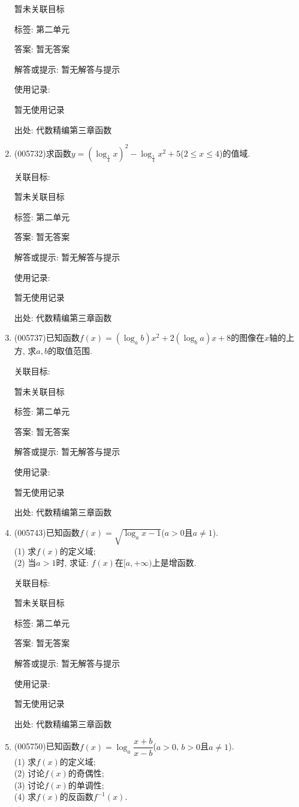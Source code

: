 \documentclass[10pt,a4paper]{article}
\begin{document}
\begin{enumerate}[1.]
暂未关联目标



标签: 第二单元

答案: 暂无答案

解答或提示: 暂无解答与提示

使用记录:

暂无使用记录


出处: 代数精编第三章函数
\item { (005732)}求函数$y=(\log_{\frac 14}x)^2-\log_{\frac 14}x^2+5$($2\le x\le 4$)的值域.


关联目标:

暂未关联目标



标签: 第二单元

答案: 暂无答案

解答或提示: 暂无解答与提示

使用记录:

暂无使用记录


出处: 代数精编第三章函数
\item { (005737)}已知函数$f(x)=(\log_ab)x^2+2(\log_ba)x+8$的图像在$x$轴的上方, 求$a,b$的取值范围.


关联目标:

暂未关联目标



标签: 第二单元

答案: 暂无答案

解答或提示: 暂无解答与提示

使用记录:

暂无使用记录


出处: 代数精编第三章函数
\item { (005743)}已知函数$f(x)=\sqrt {\log_ax-1}$($a>0$且$a\ne 1$).\\
(1) 求$f(x)$的定义域;\\
(2) 当$a>1$时, 求证: $f(x)$在$[a,+\infty)$上是增函数.


关联目标:

暂未关联目标



标签: 第二单元

答案: 暂无答案

解答或提示: 暂无解答与提示

使用记录:

暂无使用记录


出处: 代数精编第三章函数
\item { (005750)}已知函数$f(x)=\log_a\dfrac{x+b}{x-b}$($a>0$, $b>0$且$a\ne 1$).\\
(1) 求$f(x)$的定义域;\\
(2) 讨论$f(x)$的奇偶性;\\
(3) 讨论$f(x)$的单调性;\\
(4) 求$f(x)$的反函数$f^{-1}(x)$.



\end{enumerate}
\end{document}
